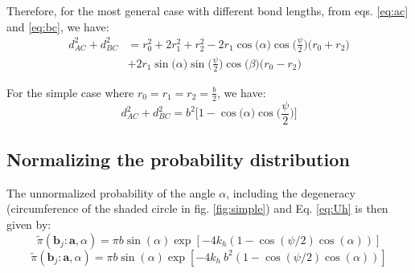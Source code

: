     Therefore, for the most general case with different bond lengths, from eqs. \eqref{eq:ac} and \eqref{eq:bc}, we have:
    \begin{equation}
        \begin{aligned}
            d_{AC}^2 + d_{BC}^2 &= r_0^2 + 2  r_1^2 + r_2^2 - 2  r_1  \cos \big( \alpha \big)  \cos \Big(\displaystyle\frac{\psi}{2}\Big)  \big( r_0 + r_2 \big)\\
            &+ 2  r_1  \sin \big( \alpha \big)  \sin \Big(\displaystyle\frac{\psi}{2}\Big)  \cos \big( \beta \big)  \big( r_0 - r_2 \big)
        \end{aligned}
    \end{equation}

    For the simple case where $r_0 = r_1 = r_2 = \displaystyle\frac{b}{2}$, we have:
    \begin{equation}
    \label{eq:final}
        d_{AC}^2 + d_{BC}^2 = b^2  \Big[ 1 - \cos \big( \alpha \big)  \cos \Big(\displaystyle\frac{\psi}{2}\Big) \Big]
    \end{equation}
\subsection{Normalizing the probability distribution}
    \label{Appendix C}
    The unnormalized probability of the angle $\alpha$, including the degeneracy (circumference of the shaded circle in fig. \ref{fig:simple}) and Eq. \eqref{eq:Uh} is then given by:
    \ifkhExplicitP
        \begin{equation}
            \label{eq:piTildeAlpha}
            \tilde \pi({\mathbf b}_j: {\mathbf a}, \alpha)  = \pi b \sin(\alpha) \exp[-4k_h(1 - \cos(\psi/2) \cos(\alpha))]
        \end{equation}
    \else
        \begin{equation}
        \label{eq:piTildeAlpha}
            \tilde \pi({\mathbf b}_j: {\mathbf a}, \alpha)  = \pi b \sin(\alpha) \exp[-4k_h~b^2 (1 - \cos(\psi/2) \cos(\alpha))]
        \end{equation}
    \fi

